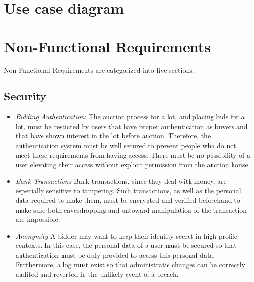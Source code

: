 \documentclass[titlepage, 12pt]{extarticle}
\begin{document}
\section{Use case diagram}

\section{Non-Functional Requirements}
Non-Functional Requirements are categorized into five sections:
\subsection{Security}
\begin{itemize}
\item {\it Bidding Authentication}: The auction process for a lot, and placing bids for a lot, must be resticted by users that have proper authentication as buyers and that have shown interest in the lot before auction. Therefore, the authentication system must be well secured to prevent people who do not meet these requirements from having access. There must be no possibility of a user elevating their access without explicit permission from the auction house.
\item {\it Bank Transactions} Bank transactions, since they deal with money, are especially sensitive to tampering. Such transactions, as well as the personal data required to make them, must be encrypted and verified beforehand to make sure both eavesdropping and untoward manipulation of the transaction are impossible.
\item {\it Anonymity} A bidder may want to keep their identity secret in high-profile contexts. In this case, the personal data of a user must be secured so that authentication must be duly provided to access this personal data. Furthermore, a log must exist so that administratie changes can be correctly audited and reverted in the unlikely event of a breach.
\end{itemize}
\end{document}
